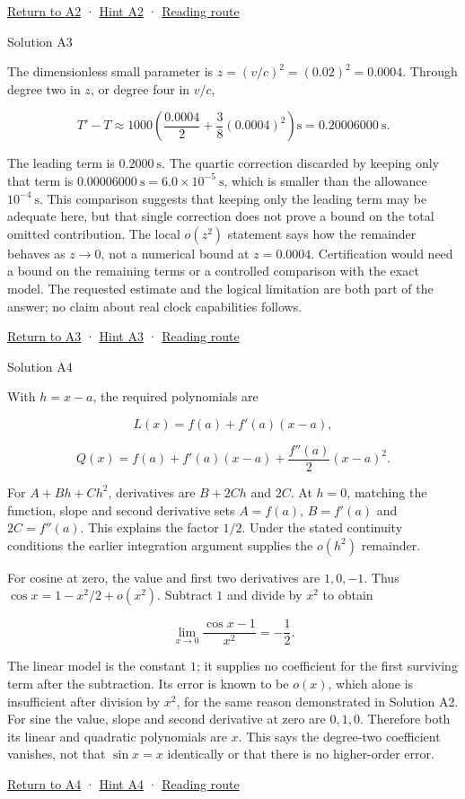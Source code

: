 \documentclass[
  11pt,
]{article}
\begin{document}
\protect\hyperlink{a2}{Return to A2} · \protect\hyperlink{h2}{Hint A2} ·
\protect\hyperlink{route}{Reading route}

Solution A3

The dimensionless small parameter is \(z=(v/c)^2=(0.02)^2=0.0004\).
Through degree two in \(z\), or degree four in \(v/c\),

\[T'-T\approx1000\left(\frac{0.0004}{2}+\frac38(0.0004)^2\right)\mathrm{s}
=0.20006000\ \mathrm{s}.\]

The leading term is \(0.2000\ \mathrm{s}\). The quartic correction
discarded by keeping only that term is
\(0.00006000\ \mathrm{s}=6.0\times10^{-5}\ \mathrm{s}\), which is
smaller than the allowance \(10^{-4}\ \mathrm{s}\). This comparison
suggests that keeping only the leading term may be adequate here, but
that single correction does not prove a bound on the total omitted
contribution. The local \(o(z^2)\) statement says how the remainder
behaves as \(z\to0\), not a numerical bound at \(z=0.0004\).
Certification would need a bound on the remaining terms or a controlled
comparison with the exact model. The requested estimate and the logical
limitation are both part of the answer; no claim about real clock
capabilities follows.

\protect\hyperlink{a3}{Return to A3} · \protect\hyperlink{h3}{Hint A3} ·
\protect\hyperlink{route}{Reading route}

Solution A4

With \(h=x-a\), the required polynomials are

\[L(x)=f(a)+f'(a)(x-a),\]

\[Q(x)=f(a)+f'(a)(x-a)+\frac{f''(a)}2(x-a)^2.\]

For \(A+Bh+Ch^2\), derivatives are \(B+2Ch\) and \(2C\). At \(h=0\),
matching the function, slope and second derivative sets \(A=f(a)\),
\(B=f'(a)\) and \(2C=f''(a)\). This explains the factor \(1/2\). Under
the stated continuity conditions the earlier integration argument
supplies the \(o(h^2)\) remainder.

For cosine at zero, the value and first two derivatives are \(1,0,-1\).
Thus \(\cos x=1-x^2/2+o(x^2)\). Subtract \(1\) and divide by \(x^2\) to
obtain

\[\lim_{x\to0}\frac{\cos x-1}{x^2}=-\frac12.\]

The linear model is the constant \(1\); it supplies no coefficient for
the first surviving term after the subtraction. Its error is known to be
\(o(x)\), which alone is insufficient after division by \(x^2\), for the
same reason demonstrated in Solution A2. For sine the value, slope and
second derivative at zero are \(0,1,0\). Therefore both its linear and
quadratic polynomials are \(x\). This says the degree-two coefficient
vanishes, not that \(\sin x=x\) identically or that there is no
higher-order error.

\protect\hyperlink{a4}{Return to A4} · \protect\hyperlink{h4}{Hint A4} ·
\protect\hyperlink{route}{Reading route}
\end{document}
